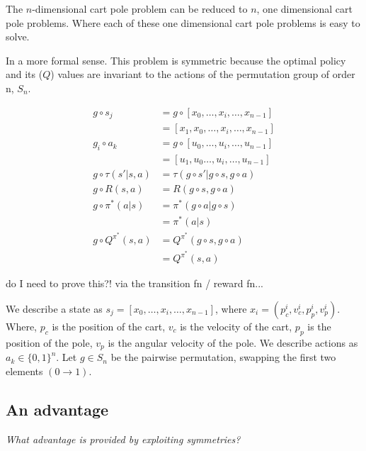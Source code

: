 The $n$-dimensional cart pole problem can be reduced to $n$, one dimensional cart pole problems.
Where each of these one dimensional cart pole problems is easy to solve.

In a more formal sense. This problem is symmetric because the optimal policy and its ($Q$) values are invariant to the actions of the permutation group of order n, $S_n$.

\begin{align*}
g \circ s_j &= g \circ [x_0, \dots, x_i, \dots, x_{n-1}] \\
&= [x_1, x_0, \dots, x_i, \dots, x_{n-1}] \\
g_i \circ a_k &= g \circ [u_0, \dots, u_i, \dots, u_{n-1}] \\
&= [u_1, u_0 \dots, u_i, \dots, u_{n-1}] \\
g\circ \tau(s'|s, a) &= \tau(g\circ s'|g\circ s, g\circ a) \\
g\circ R(s, a) &= R(g\circ s, g\circ a) \\
g\circ \pi^{* }(a|s) &= \pi^{* }(g\circ a| g\circ s) \\
&= \pi^{* }(a|s) \tag{invariance of the optimal policy}\\
g\circ Q^{\pi^{* }}(s, a) &= Q^{\pi^{* }}(g\circ s, g\circ a) \\
&= Q^{\pi^{* }}(s, a) \tag{invariance of the optimal values}
\end{align*}

{\color{red}do I need to prove this?! via the transition fn / reward fn...}

We describe a state as $s_j = [x_0, \dots, x_i, \dots, x_{n-1}]$, where $x_i = (p_c^i, v_c^i, p_p^i, v_p^i)$. Where, $p_c$ is the position of the cart, $v_c$ is the velocity of the cart, $p_p$ is the position of the pole, $v_p$ is the angular velocity of the pole. We describe actions as $a_k \in \{0, 1\}^n$. Let $g\in S_n$ be the pairwise permutation, swapping the first two elements $(0\to 1)$.



\subsection{An advantage}

\begin{displayquote}
\textit{What advantage is provided by exploiting symmetries?}
\end{displayquote}

